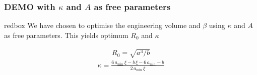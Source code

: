 \documentclass[hyperref={colorlinks=true,urlcolor=blue,linkcolor=.},aspectratio=1610,mathserif]{beamer}
\begin{document}
\begin{frame}
	\frametitle{DEMO with \(\kappa\) and \(A\) as free parameters}
	\begin{centering}
		\begin{beamercolorbox}[sep=1em,wd=8cm]{redbox}
			We have chosen to optimise the engineering volume and \(\beta\) using \(\kappa\) and \(A\) as free parameters. This yields optimum \(R_{0}\) and \(\kappa\)
		\end{beamercolorbox}
	\end{centering}
	\begin{align}
		R_{0}=\sqrt{a^{3}/b}
	\end{align}
	\begin{align}
		\kappa=\frac{6\, a_{\min}\,\xi-b\,\xi-6\, a_{\min}-b}{2\, a_{\min}\,\xi}
	\end{align}
\end{frame}
\end{document}
